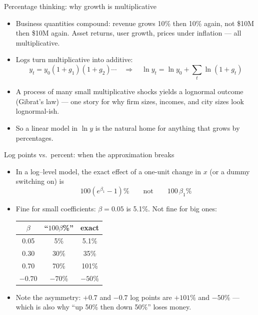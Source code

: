 \documentclass[aspectratio=169,11pt]{beamer}
\begin{document}
\begin{frame}{Percentage thinking: why growth is multiplicative}
\begin{itemize}
	\item Business quantities \alert{compound}: revenue grows 10\% then 10\% again,
	not \$10M then \$10M again. Asset returns, user growth, prices under inflation ---
	all multiplicative.

	\medskip
	\item Logs turn multiplicative into additive:\[
	y_t = y_0 (1+g_1)(1+g_2)\cdots \quad \Longrightarrow \quad
	\ln y_t = \ln y_0 + \textstyle\sum_t \ln(1+g_t)
	\]

	\medskip
	\item A process of many small multiplicative shocks yields a \alert{lognormal}
	outcome (Gibrat's law) --- one story for why firm sizes, incomes, and city sizes
	look lognormal-ish.

	\medskip
	\item So a linear model in $\ln y$ is the natural home for anything that grows
	by percentages.
\end{itemize}
\end{frame}


\begin{frame}{Log points vs.\ percent: when the approximation breaks}
\begin{itemize}
	\item In a log--level model, the exact effect of a one-unit change in $x$ (or a
	dummy switching on) is\[
	100 \left( e^{\beta_1} - 1 \right)\% \qquad \text{not} \qquad 100\,\beta_1 \%
	\]

	\medskip
	\item Fine for small coefficients: $\beta = 0.05$ is 5.1\%. Not fine for big ones:
	\begin{center}
	\begin{tabular}{ccc}
	$\beta$ & ``$100\beta$\%'' & exact \\
	\hline
	0.05 & 5\% & 5.1\% \\
	0.30 & 30\% & 35\% \\
	0.70 & 70\% & \alert{101\%} \\
	$-0.70$ & $-70$\% & \alert{$-50$\%} \\
	\end{tabular}
	\end{center}

	\medskip
	\item Note the asymmetry: $+0.7$ and $-0.7$ log points are $+101\%$ and $-50\%$
	--- which is also why ``up 50\% then down 50\%'' loses money.
\end{itemize}
\end{frame}
\end{document}
